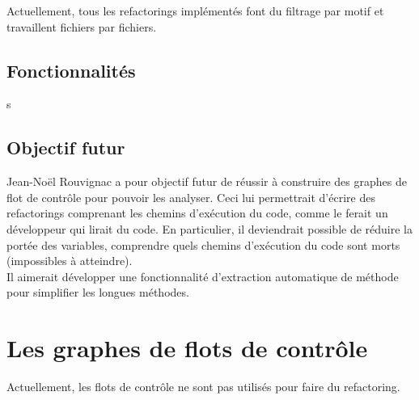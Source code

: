 \documentclass[a4paper,twoside,12pt,openright]{report}
\begin{document}
Actuellement, tous les refactorings implémentés font du filtrage par motif et travaillent fichiers par fichiers.
\subsection{Fonctionnalités}
s

\subsection{Objectif futur}
Jean-Noël Rouvignac a pour objectif futur de réussir à construire des graphes de flot de contrôle pour pouvoir les analyser. Ceci lui permettrait d'écrire des refactorings comprenant les chemins d'exécution du code, comme le ferait un développeur qui lirait du code. En particulier, il deviendrait possible de réduire la portée des variables, comprendre quels chemins d'exécution du code sont morts (impossibles à atteindre).\cite{ref7}\\
Il aimerait développer une fonctionnalité d'extraction automatique de méthode pour simplifier les longues méthodes.



\section{Les graphes de flots de contrôle}
Actuellement, les flots de contrôle ne sont pas utilisés pour faire du refactoring.







\end{document}
